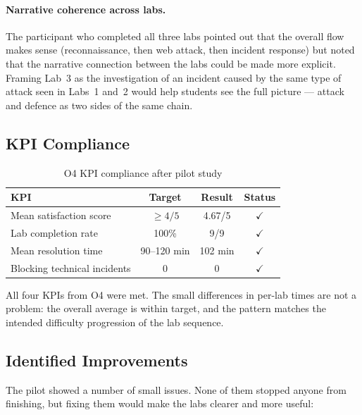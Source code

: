 \paragraph{Narrative coherence across labs.}
The participant who completed all three labs pointed out that the overall
flow makes sense (reconnaissance, then web attack, then incident response)
but noted that the narrative connection between the labs could be made more explicit. Framing
Lab~3 as the investigation of an incident caused by the same type of attack
seen in Labs~1 and~2 would help students see the full picture --- attack and
defence as two sides of the same chain.

\subsection{KPI Compliance}

\begin{table}[H]
  \centering
  \small
  \renewcommand{\arraystretch}{1.15}
  \begin{tabularx}{\textwidth}{X c c c}
    \toprule
    \textbf{KPI} & \textbf{Target} & \textbf{Result} & \textbf{Status} \\
    \midrule
    Mean satisfaction score      & $\geq 4/5$   & 4.67/5  & $\checkmark$ \\
    Lab completion rate          & 100\%         & 9/9     & $\checkmark$ \\
    Mean resolution time         & 90--120 min   & 102 min & $\checkmark$ \\
    Blocking technical incidents & 0             & 0       & $\checkmark$ \\
    \bottomrule
  \end{tabularx}
  \caption{O4 KPI compliance after pilot study}
  \label{tab:kpi_compliance}
\end{table}

All four KPIs from O4 were met. The small differences in per-lab times are
not a problem: the overall average is within target, and the pattern matches
the intended difficulty progression of the lab sequence.

\subsection{Identified Improvements}

The pilot showed a number of small issues. None of them stopped anyone from
finishing, but fixing them would make the labs clearer and more useful:


